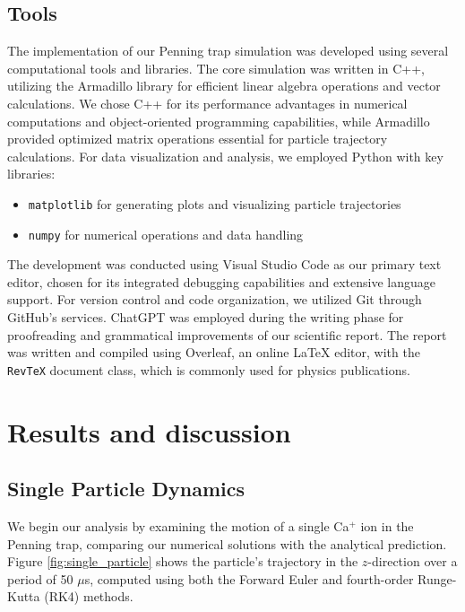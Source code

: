 \documentclass[english,notitlepage,reprint,nofootinbib]{revtex4-2}  %
\begin{document}
\subsection{Tools}
The implementation of our Penning trap simulation was developed using several computational tools and libraries. The core simulation was written in C++, utilizing the Armadillo library for efficient linear algebra operations and vector calculations. We chose C++ for its performance advantages in numerical computations and object-oriented programming capabilities, while Armadillo provided optimized matrix operations essential for particle trajectory calculations.
For data visualization and analysis, we employed Python with key libraries:
\begin{itemize}
\item \texttt{matplotlib} for generating plots and visualizing particle trajectories
\item \texttt{numpy} for numerical operations and data handling
\end{itemize}
The development was conducted using Visual Studio Code as our primary text editor, chosen for its integrated debugging capabilities and extensive language support. For version control and code organization, we utilized Git through GitHub's services.
ChatGPT was employed during the writing phase for proofreading and grammatical improvements of our scientific report. The report was written and compiled using Overleaf, an online LaTeX editor, with the \texttt{RevTeX} document class, which is commonly used for physics publications.

\section{Results and discussion}\label{sec:results_and_discussion}

\subsection{Single Particle Dynamics}

We begin our analysis by examining the motion of a single Ca$^+$ ion in the Penning trap, comparing our numerical solutions with the analytical prediction. Figure \ref{fig:single_particle} shows the particle's trajectory in the $z$-direction over a period of 50 $\mu$s, computed using both the Forward Euler and fourth-order Runge-Kutta (RK4) methods.
\end{document}
